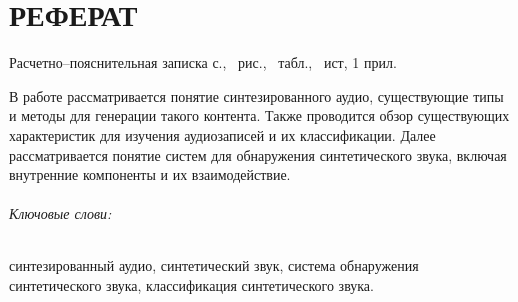 \part*{РЕФЕРАТ}

Расчетно--пояснительная записка \pageref{LastPage} с., \totalfigures\ рис., \totaltables\ табл., \thetotalbibentries\ ист, 1 прил.

В работе рассматривается понятие синтезированного аудио, существующие типы и методы для генерации такого контента. Также проводится обзор существующих характеристик для изучения аудиозаписей и их классификации. Далее рассматривается понятие систем для обнаружения синтетического звука, включая внутренние компоненты и их взаимодействие.

\paragraph*{Ключовые слови:} синтезированный аудио, синтетический звук, система обнаружения синтетического звука, классификация синтетического звука.